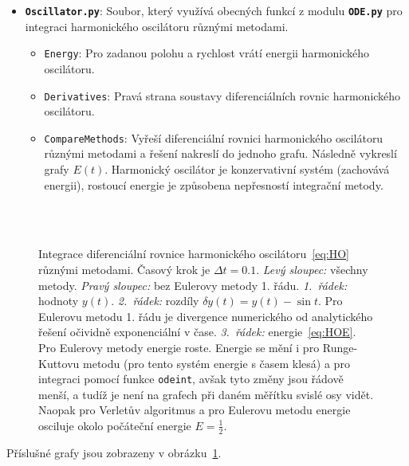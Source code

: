 \documentclass[a4paper,11pt,twoside]{article}
\def\code#1{\textnormal{\texttt{#1}}}
\def\file#1{\textnormal{\textbf{\texttt{#1}}}}
\begin{document}
\begin{solution}
\begin{itemize}
        \item \file{Oscillator.py}:
            Soubor, který využívá obecných funkcí z modulu \file{ODE.py} pro integraci harmonického oscilátoru různými metodami.
            \begin{itemize}
            \item \code{Energy}:
                Pro zadanou polohu a rychlost vrátí energii harmonického oscilátoru.
            \item \code{Derivatives}:
                Pravá strana soustavy diferenciálních rovnic harmonického oscilátoru. 
            \item \code{CompareMethods}:
                Vyřeší diferenciální rovnici harmonického oscilátoru různými metodami a řešení nakreslí do jednoho grafu.
                Následně vykreslí grafy $E(t)$.
                Harmonický oscilátor je konzervativní systém (zachovává energii), rostoucí energie je způsobena ne\-přes\-nos\-tí integrační metody.
            \end{itemize}
        \end{itemize}

        \begin{figure}[!htbp]
            \centering
			\\
			\\
			\caption{
                \protect\small
                Integrace diferenciální rovnice harmonického oscilátoru~\eqref{eq:HO} různými metodami.
                Časový krok je $\Delta t=0.1$.
                \emph{Levý sloupec:} všechny metody.
                \emph{Pravý sloupec:} bez Eulerovy metody 1. řádu.
                \emph{1.~řádek:} hodnoty $y(t)$.
                \emph{2.~řádek:} rozdíly $\delta y(t)=y(t)-\sin{t}$.
                Pro Eulerovu metodu 1. řádu je divergence numerického od analytického řešení očividně exponenciální v čase.
                \emph{3.~řádek:} energie~\eqref{eq:HOE}. 
                Pro Eulerovy metody energie roste.
                Energie se mění i pro Runge-Kuttovu metodu (pro tento systém energie s časem klesá) a pro integraci pomocí funkce \code{odeint}, avšak tyto změny jsou řádově menší, a tudíž je není na grafech při daném měřítku svislé osy vidět.
                Naopak pro Verletův algoritmus a pro  Eulerovu metodu energie osciluje okolo počáteční energie $E=\frac{1}{2}$.
            }	
            \label{fig:HO}
		\end{figure}

        Příslušné grafy jsou zobrazeny v obrázku~\ref{fig:HO}.
    \end{solution}
\end{document}
